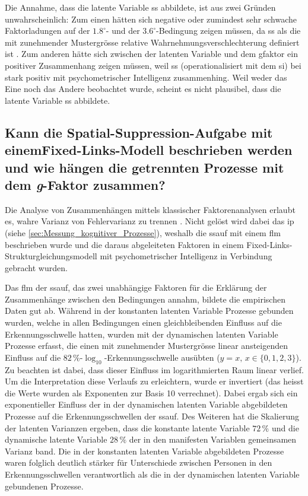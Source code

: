 \documentclass[11pt, twoside, a4paper]{book}		%
\begin{document}
Die Annahme, dass die latente Variable \gls{ss} abbildete, ist aus zwei Gründen unwahrscheinlich: Zum einen hätten sich negative oder zumindest sehr schwache Faktorladungen auf der $1.8^{\circ}$- und der $3.6^{\circ}$-Bedingung zeigen müssen, da \gls{ss} als die mit zunehmender Mustergrösse relative  Wahrnehmungsverschlechterung definiert ist \citep{Melnick2013, Tadin2003, Tadin2006, Tadin2011}. Zum anderen hätte sich zwischen der latenten Variable und dem \gls{gfaktor} ein positiver Zusammenhang zeigen müssen, weil \gls{ss} (operationalisiert mit dem \gls{si}) bei \citet{Melnick2013} stark positiv mit psychometrischer Intelligenz zusammenhing.
Weil weder das Eine noch das Andere beobachtet wurde, scheint es nicht plausibel, dass die latente Variable \gls{ss} abbildete.

\subsection{Kann die Spa\-tial-Sup\-pres\-sion-Auf\-gabe mit einem\break Fixed-Links-Mo\-dell beschrieben werden und wie hängen die getrennten Prozesse mit dem \textit{g}-Faktor zusammen?}

Die Analyse von Zusammenhängen mittels klassischer Faktorenanalysen erlaubt es, wahre Varianz von Fehlervarianz zu trennen \citep[S. 9]{Kline2011}.
Nicht gelöst wird dabei das \gls{ip} (siehe \autoref{sec:Messung_kognitiver_Prozesse}), weshalb die \gls{ssauf} mit einem \gls{flm} \citep[z.~B.][]{Schweizer2006a, Schweizer2006b, Schweizer2007, Schweizer2008, Schweizer2009a} beschrieben wurde und die daraus abgeleiteten Faktoren in einem Fixed-Links-Struk\-tur\-glei\-chungs\-mo\-dell mit psychometrischer Intelligenz in Verbindung gebracht wurden.

Das \gls{flm} der \gls{ssauf}, das zwei unabhängige Faktoren für die Erklärung der Zusammenhänge zwischen den Bedingungen annahm, bildete die empirischen Daten  gut ab. 
Während in der konstanten latenten Variable Prozesse gebunden wurden, welche in allen Bedingungen einen gleichbleibenden Einfluss auf die Er\-ken\-nungs\-schwel\-le hatten, wurden mit der dynamischen latenten Variable Prozesse erfasst, die einen mit zunehmender Mustergrösse linear ansteigenden Einfluss auf die $82\,\%$-$\log_{10}$-Er\-ken\-nungs\-schwel\-le ausübten ($y=x,\,x\in\{0, 1, 2, 3\}$).
Zu beachten ist dabei, dass dieser Einfluss im logarithmierten Raum linear verlief. Um die Interpretation diese Verlaufs zu erleichtern, wurde er invertiert (das heisst die Werte wurden als Exponenten zur Basis 10 verrechnet).
Dabei ergab sich ein exponentieller Einfluss der in der dynamischen latenten Variable abgebildeten Prozesse auf die Erkennungsschwellen der \gls{ssauf}. Des Weiteren hat die Skalierung der latenten Varianzen ergeben, dass die konstante latente Variable $72\,\%$ und die dynamische latente Variable $28\,\%$ der in den manifesten Variablen gemeinsamen Varianz band. 
Die in der konstanten latenten Variable abgebildeten Prozesse waren folglich deutlich stärker für Unterschiede zwischen Personen in den Erkennungsschwellen verantwortlich als die in der dynamischen latenten Variable gebundenen Prozesse.
\end{document}
